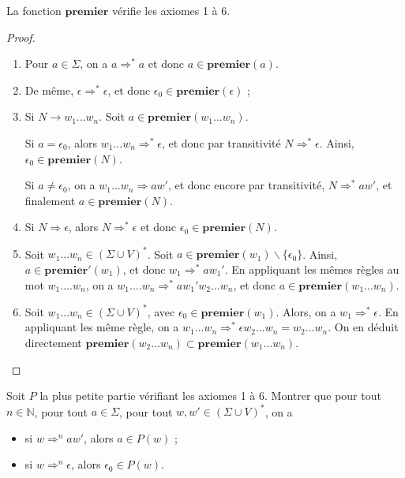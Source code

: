 \begin{lemma}\label{lemmePremier1}
La fonction $\mathbf{premier}$ vérifie les axiomes 1 à 6.
\end{lemma}

\begin{proof}~

\begin{enumerate}
\item Pour $a\in \Sigma$, on a $a\Rightarrow^* a$ et donc $a\in \mathbf{premier}(a)$.
\item De même, $\epsilon \Rightarrow^* \epsilon$, et donc $\epsilon_0 \in \mathbf{premier}(\epsilon)$ ;
\item Si $N\rightarrow w_1...w_n$. Soit $a\in \mathbf{premier}(w_1...w_n)$. 

Si $a=\epsilon_0$, alors $w_1...w_n \Rightarrow^* \epsilon$, et donc par transitivité $N\Rightarrow^* \epsilon$. Ainsi, $\epsilon_0\in \mathbf{premier}(N)$. 

Si $a\neq \epsilon_0$, on a $w_1...w_n \Rightarrow aw'$, et donc encore par transitivité, $N\Rightarrow^* aw'$, et finalement $a\in \mathbf{premier}(N)$.

\item Si $N\Rightarrow \epsilon$, alors $N\Rightarrow^* \epsilon$ et donc $\epsilon_0 \in \mathbf{premier}(N)$.

\item Soit $w_1...w_n\in ( \Sigma \cup V)^*$. Soit $a\in \mathbf{premier}(w_1) \backslash\{\epsilon_0\}$. Ainsi, $a\in \mathbf{premier}'(w_1)$, et donc $w_1\Rightarrow^*aw_1'$. En appliquant les mêmes règles au mot $w_1....w_n$, on a $w_1....w_n \Rightarrow^* aw_1'w_2...w_n$, et donc $a\in \mathbf{premier}(w_1...w_n)$.

\item Soit $w_1...w_n\in ( \Sigma \cup V)^*$, avec $\epsilon_0\in \mathbf{premier}(w_1)$. Alors, on a $w_1\Rightarrow^*\epsilon$. En appliquant les même règle, on a $w_1...w_n \Rightarrow^* \epsilon w_2...w_n = w_2...w_n$. On en déduit directement $\mathbf{premier}(w_2...w_n) \subset \mathbf{premier}(w_1...w_n)$.

\end{enumerate}
\end{proof}


\begin{lemma}\label{lemmePremier2}
Soit $P$ la plus petite partie vérifiant les axiomes 1 à 6. Montrer que pour tout $n\in \mathbb{N}$, pour tout $a\in \Sigma$, pour tout $w,w' \in (\Sigma \cup V)^*$, on a 
\begin{itemize}
\item si $w \Rightarrow^n aw'$, alors $a\in P(w)$ ;
\item si $w \Rightarrow^n \epsilon$, alors $\epsilon_0 \in P(w)$.
\end{itemize}
\end{lemma}



